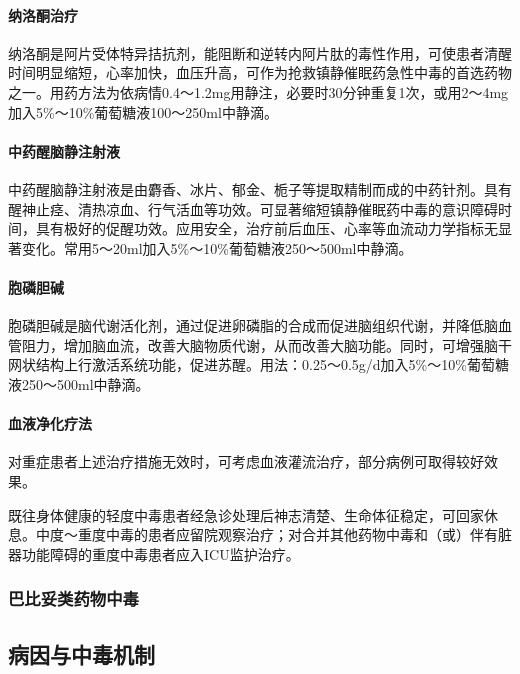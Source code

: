 \paragraph{纳洛酮治疗}

纳洛酮是阿片受体特异拮抗剂，能阻断和逆转内阿片肽的毒性作用，可使患者清醒时间明显缩短，心率加快，血压升高，可作为抢救镇静催眠药急性中毒的首选药物之一。用药方法为依病情0.4～1.2mg用静注，必要时30分钟重复1次，或用2～4mg加入5\%～10\%葡萄糖液100～250ml中静滴。

\paragraph{中药醒脑静注射液}

中药醒脑静注射液是由麝香、冰片、郁金、栀子等提取精制而成的中药针剂。具有醒神止痉、清热凉血、行气活血等功效。可显著缩短镇静催眠药中毒的意识障碍时间，具有极好的促醒功效。应用安全，治疗前后血压、心率等血流动力学指标无显著变化。常用5～20ml加入5\%～10\%葡萄糖液250～500ml中静滴。

\paragraph{胞磷胆碱}

胞磷胆碱是脑代谢活化剂，通过促进卵磷脂的合成而促进脑组织代谢，并降低脑血管阻力，增加脑血流，改善大脑物质代谢，从而改善大脑功能。同时，可增强脑干网状结构上行激活系统功能，促进苏醒。用法：0.25～0.5g/d加入5\%～10\%葡萄糖液250～500ml中静滴。

\paragraph{血液净化疗法}

对重症患者上述治疗措施无效时，可考虑血液灌流治疗，部分病例可取得较好效果。

既往身体健康的轻度中毒患者经急诊处理后神志清楚、生命体征稳定，可回家休息。中度～重度中毒的患者应留院观察治疗；对合并其他药物中毒和（或）伴有脏器功能障碍的重度中毒患者应入ICU监护治疗。

\subsubsection{巴比妥类药物中毒}

\subsection{病因与中毒机制}

